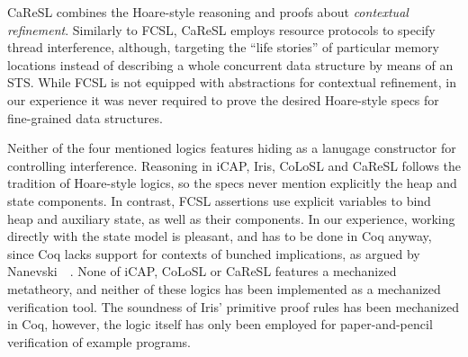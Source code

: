 
CaReSL combines the Hoare-style reasoning and proofs about
\emph{contextual refinement}.  Similarly to FCSL, CaReSL employs
resource protocols to specify thread interference, although, targeting
the ``life stories'' of particular memory locations instead of
describing a whole concurrent data structure by means of an STS.
While FCSL is not equipped with abstractions for contextual
refinement, in our experience it was never required to prove the
desired Hoare-style specs for fine-grained data structures.

Neither of the four mentioned logics features hiding as a lanugage
constructor for controlling interference.
%
Reasoning in iCAP, Iris, CoLoSL and CaReSL follows the tradition of
Hoare-style logics, so the specs never mention explicitly the heap and
state components. In contrast, FCSL assertions use explicit variables
to bind heap and auxiliary state, as well as their components. In our
experience, working directly with the state model is pleasant, and has
to be done in Coq anyway, since Coq lacks support for contexts of
bunched implications, as argued by
Nanevski~\etal~\cite{Nanevski-al:POPL10}.
%
None of iCAP, CoLoSL or CaReSL features a mechanized metatheory, and
neither of these logics has been implemented as a mechanized
verification tool. The soundness of Iris' primitive proof rules has
been mechanized in Coq, however, the logic itself has only been
employed for paper-and-pencil verification of example programs.


